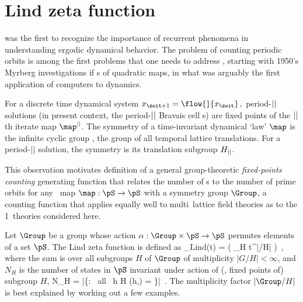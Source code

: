 

\section{Lind zeta function}
\label{sect:LC21Lind1d}

\Poincare{} was the first to  recognize the importance of
recurrent phenomena in understanding ergodic dynamical behavior. The
problem of counting periodic orbits is among the first problems that one
needs to address%
, starting with 1950's
 {Myrberg}
investigations if {\po}s of quadratic maps, in what was arguably the
first application of computers to
dynamics.

For a discrete time dynamical system
\(
\ssp_{\zeit+1}=\flow{}{\ssp_{\zeit}}
\,,\)
period-${||}$ solutions (in present context, the period-${||}$ Bravais
cell {\lattstate}s) are fixed points of the ${||}$th iterate map
$\map^\cl{}$.
The symmetry of a time-invariant dynamical `law' $\map$ is 
the {infinite cyclic group} \Cn{\infty},
the group of all temporal lattice translations. For a period-${||}$
solution, the symmetry is its translation subgroup $H_{{||}}$.

This observation motivates definition of a general group-theoretic
\emph{fixed-points counting} generating  function that relates the number
of {\lattstate}s to the number of prime orbits for any \statesp\ map
\(
\map : \pS \to \pS
\)
with a symmetry group $\Group$, a counting function that applies equally
well to multi\dmn\ lattice field theories as to the 1\dmn\
theories considered here.

Let $\Group$ be a group whose action
$\alpha: \Group \times \pS \to \pS$ 
permutes elements of a set $\pS$.
The Lind zeta function is defined as
\beq
\zeta_{Lind}(t) =
\exp \left( \sum_{H} \;
            t^{|\Group/H|}
      \right)
\,,
where the sum is over all subgroups $H$ of $\Group$
of multiplicity $|G/H| < \infty$, and $N_{H}$ is the number of states
in $\pS$ invariant under action of (\ie, fixed points of) subgroup $H$,
\beq
N_{H} =
   |\{\Xx \in \pS : \mbox{ all } h \in H \quad \alpha(h,\Xx) = \Xx\}|
\,.
The multiplicity factor $|\Group/{H}|$ is best explained by working out a
few examples.

